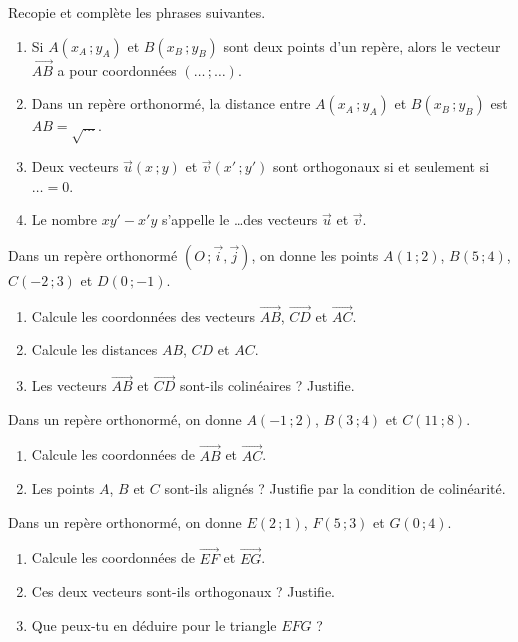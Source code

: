 \documentclass[11pt]{article}
\newcommand{\cle}[1]{{\popxbold\color{popdark}#1}}
\newcounter{popsec}
\newcounter{popsub}
\newcommand{\courssub}[1]{%
  \stepcounter{popsub}%
  \par\vspace{9pt}\noindent{\popxbold\fontsize{11.5}{13}\selectfont\color{popink}{\color{poporange}\thepopsec.\thepopsub}\hspace{6pt}#1}\par\nopagebreak\vspace{4pt}
}
\begin{document}
\begin{exercice}
Recopie et complète les phrases suivantes.
\begin{enumerate}
\item Si $A(x_A\,;y_A)$ et $B(x_B\,;y_B)$ sont deux points d'un repère, alors le vecteur $\overrightarrow{AB}$ a pour coordonnées $(\ldots\,;\ldots)$.
\item Dans un repère \cle{orthonormé}, la distance entre $A(x_A\,;y_A)$ et $B(x_B\,;y_B)$ est $AB = \sqrt{\ldots}$.
\item Deux vecteurs $\vec{u}(x\,;y)$ et $\vec{v}(x'\,;y')$ sont \cle{orthogonaux} si et seulement si $\ldots = 0$.
\item Le nombre $xy' - x'y$ s'appelle le \ldots des vecteurs $\vec{u}$ et $\vec{v}$.
\end{enumerate}
\end{exercice}

\begin{exercice}
Dans un repère orthonormé $(O\,;\vec{i},\vec{j})$, on donne les points $A(1\,;2)$, $B(5\,;4)$, $C(-2\,;3)$ et $D(0\,;-1)$.
\begin{enumerate}
\item Calcule les coordonnées des vecteurs $\overrightarrow{AB}$, $\overrightarrow{CD}$ et $\overrightarrow{AC}$.
\item Calcule les distances $AB$, $CD$ et $AC$.
\item Les vecteurs $\overrightarrow{AB}$ et $\overrightarrow{CD}$ sont-ils colinéaires ? Justifie.
\end{enumerate}
\end{exercice}

\courssub{Je m'entraîne}

\begin{exercice}
Dans un repère orthonormé, on donne $A(-1\,;2)$, $B(3\,;4)$ et $C(11\,;8)$.
\begin{enumerate}
\item Calcule les coordonnées de $\overrightarrow{AB}$ et $\overrightarrow{AC}$.
\item Les points $A$, $B$ et $C$ sont-ils alignés ? Justifie par la condition de colinéarité.
\end{enumerate}
\end{exercice}

\begin{exercice}[Orthogonalité]
Dans un repère orthonormé, on donne $E(2\,;1)$, $F(5\,;3)$ et $G(0\,;4)$.
\begin{enumerate}
\item Calcule les coordonnées de $\overrightarrow{EF}$ et $\overrightarrow{EG}$.
\item Ces deux vecteurs sont-ils orthogonaux ? Justifie.
\item Que peux-tu en déduire pour le triangle $EFG$ ?
\end{enumerate}
\end{exercice}
\end{document}
